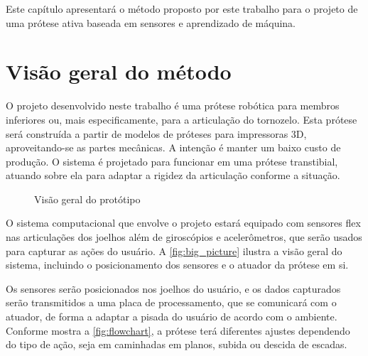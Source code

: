 Este capítulo apresentará o método proposto por este trabalho para o projeto de uma prótese ativa baseada em sensores e aprendizado de máquina.

\section{Visão geral do método}
\label{sec:metodo_protese}

O projeto desenvolvido neste trabalho é uma prótese robótica para membros inferiores ou, mais especificamente, para a articulação do tornozelo. Esta prótese será construída a partir de modelos de próteses para impressoras 3D, aproveitando-se as partes mecânicas. A intenção é manter um baixo custo de produção. O sistema é projetado para funcionar em uma prótese transtibial, atuando sobre ela para adaptar a rigidez da articulação conforme a situação.

\begin{figure}[h]
	\caption{\label{fig:big_picture}Visão geral do protótipo}
	\begin{center}
	\end{center}
\end{figure}

O sistema computacional que envolve o projeto estará equipado com sensores flex nas articulações dos joelhos além de giroscópios e acelerômetros, que serão usados para capturar as ações do usuário. A \autoref{fig:big_picture} ilustra a visão geral do sistema, incluindo o posicionamento dos sensores e o atuador da prótese em si.

Os sensores serão posicionados nos joelhos do usuário, e os dados capturados serão transmitidos a uma placa de processamento, que se comunicará com o atuador, de forma a adaptar a pisada do usuário de acordo com o ambiente. Conforme mostra a \autoref{fig:flowchart}, a prótese terá diferentes ajustes dependendo do tipo de ação, seja em caminhadas em planos, subida ou descida de escadas.

